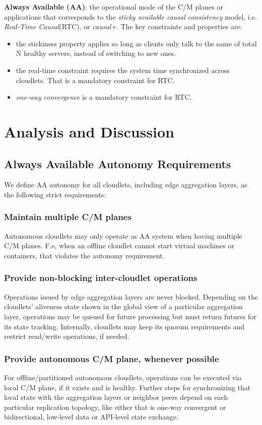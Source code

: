 \documentclass[conference]{IEEEtran}
\begin{document}
\textbf{Always Available (AA)}: the operational mode of the C/M planes or
applications that corresponds to the \textit{sticky available causal
consistency}\cite{b4} model, i.e. \textit{Real-Time Causal}(RTC)\cite{b2}, or
\textit{causal+}\cite{b1}. The key constraints and properties are:
\begin{itemize}
  \item the stickiness property applies so long as clients only talk to the
    same of total $\mathrm{N}$ healthy servers, instead of switching to new
    ones.
  \item the real-time constraint requires the system time synchronized across
    cloudlets. That is a mandatory constraint for RTC.
  \item \textit{one-way convergence}\cite{b2} is a mandatory constraint for
    RTC.
\end{itemize}

\section{Analysis and Discussion}
\subsection{Always Available Autonomy Requirements}
We define AA autonomy for all cloudlets, including edge aggregation layers, as
the following strict requirements:

\subsubsection{Maintain multiple C/M planes}
Autonomous cloudlets may only operate as AA system when having multiple
C/M planes. F.e, when an offline cloudlet cannot start virtual machines
or containers, that violates the autonomy requirement.

\subsubsection{Provide non-blocking inter-cloudlet operations}
Operations issued by edge aggregation layers are never blocked. Depending on
the cloudlets' aliveness state shown in the global view of a particular
aggregation layer, operations may be queued for future processing but must
return futures for its state tracking. Internally, cloudlets may keep its
quorum requirements and restrict read/write operations, if needed.

\subsubsection{Provide autonomous C/M plane, whenever possible}
For offline/partitioned autonomous cloudlets, operations can be executed via
local C/M plane, if it exists and is healthy. Further steps for synchronizing
that local state with the aggregation layers or neighbor peers depend on each
particular replication topology, like either that is one-way convergent or
bidirectional, low-level data or API-level state exchange.
\end{document}
